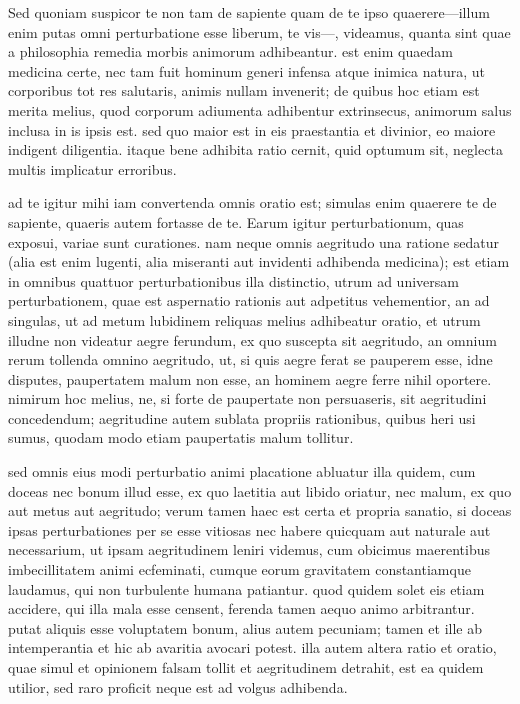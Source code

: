  Sed quoniam suspicor te non tam de sapiente quam de te ipso quaerere—illum enim putas omni perturbatione esse liberum, te vis—, videamus, quanta sint quae a philosophia remedia morbis animorum adhibeantur. est enim quaedam medicina certe, nec tam fuit hominum generi infensa atque inimica natura, ut corporibus tot res salutaris, animis nullam invenerit; de quibus hoc etiam est merita melius, quod corporum adiumenta adhibentur extrinsecus, animorum salus inclusa in is ipsis est. sed quo maior est in eis praestantia et divinior, eo maiore indigent diligentia. itaque bene adhibita ratio cernit, quid optumum sit, neglecta multis implicatur erroribus.

 ad te igitur mihi iam convertenda omnis oratio est; simulas enim quaerere te de sapiente, quaeris autem fortasse de te. Earum igitur perturbationum, quas exposui, variae sunt curationes. nam neque omnis aegritudo una ratione sedatur (alia est enim lugenti, alia miseranti aut invidenti adhibenda medicina); est etiam in omnibus quattuor perturbationibus illa distinctio, utrum ad universam perturbationem, quae est aspernatio rationis aut adpetitus vehementior, an ad singulas, ut ad metum lubidinem reliquas melius adhibeatur oratio, et utrum illudne non videatur aegre ferundum, ex quo suscepta sit aegritudo, an omnium rerum tollenda omnino aegritudo, ut, si quis aegre ferat se pauperem esse, idne disputes, paupertatem malum non esse, an hominem aegre ferre nihil oportere. nimirum hoc melius, ne, si forte de paupertate non persuaseris, sit aegritudini concedendum; aegritudine autem sublata propriis rationibus, quibus heri usi sumus, quodam modo etiam paupertatis malum tollitur.

 sed omnis eius modi perturbatio animi placatione abluatur illa quidem, cum doceas nec bonum illud esse, ex quo laetitia aut libido oriatur, nec malum, ex quo aut metus aut aegritudo; verum tamen haec est certa et propria sanatio, si doceas ipsas perturbationes per se esse vitiosas nec habere quicquam aut naturale aut necessarium, ut ipsam aegritudinem leniri videmus, cum obicimus maerentibus imbecillitatem animi ecfeminati, cumque eorum gravitatem constantiamque laudamus, qui non turbulente humana patiantur. quod quidem solet eis etiam accidere, qui illa mala esse censent, ferenda tamen aequo animo arbitrantur. putat aliquis esse voluptatem bonum, alius autem pecuniam; tamen et ille ab intemperantia et hic ab avaritia avocari potest. illa autem altera ratio et oratio, quae simul et opinionem falsam tollit et aegritudinem detrahit, est ea quidem utilior, sed raro proficit neque est ad volgus adhibenda.

